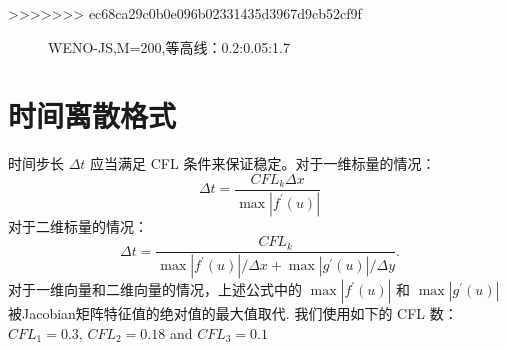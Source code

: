\documentclass{book}
\begin{document}
\begin{example}
\begin{example}{}{}
\begin{example}
\begin{example}
\begin{example}
\begin{example}{}{}
    >>>>>>> ec68ca29c0b0e096b02331435d3967d9cb52cf9f
    \begin{figure}[H]%
        \centering
        \quad
        \caption{WENO-JS,M=200,等高线：0.2:0.05:1.7}
    \end{figure}
\end{example}


\section{时间离散格式}
时间步长 $\Delta t$  应当满足 CFL 条件来保证稳定。对于一维标量的情况：
\begin{equation}
    \Delta t=\frac{C F L_{k} \Delta x}{\max \left|f^{\prime}(u)\right|}
\end{equation}
对于二维标量的情况：
\begin{equation}
    \Delta t=\frac{C F L_{k}}{\max \left|f^{\prime}(u)\right| / \Delta x+\max \left|g^{\prime}(u)\right| / \Delta y} .
\end{equation}
对于一维向量和二维向量的情况，上述公式中的 $\max \left|f^{\prime}(u)\right|$ 和 $\max \left|g^{\prime}(u)\right|$  被Jacobian矩阵特征值的绝对值的最大值取代. 我们使用如下的 CFL 数\cite{RN109}\cite{RN133}\cite{RN148}：  $CFL_1=0.3$, $C F L_{2}=0.18$  and  $C F L_{3}=0.1$


\end{example}
\end{example}
\end{example}
\end{example}
\end{example}
\end{document}
